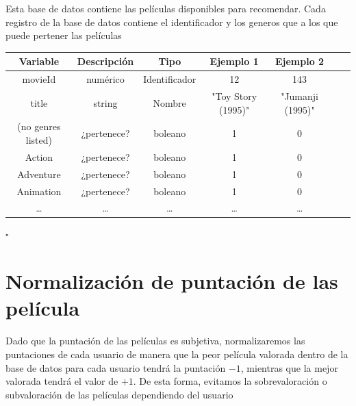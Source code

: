 \begin{db}\label{moviesref}
Esta base de datos contiene las películas disponibles para recomendar. Cada registro de la base de datos contiene el identificador y los generos que a los que puede pertener las películas

\begin{center}
    \begin{tabular}{|c|c|c|c|c|c|c|}
    \hline
    \textbf{Variable} & \textbf{Descripción} & \textbf{Tipo} & \textbf{Ejemplo 1} & \textbf{Ejemplo 2} \\ 
    \hline
    movieId & numérico   & Identificador &    12 &  143     \\
    \hline
    title   & string     & Nombre &    "Toy Story (1995)" &  "Jumanji (1995)"     \\
    \hline
    (no genres listed)  & ¿pertenece? & boleano &  1 &  0      \\
    Action              & ¿pertenece? & boleano &  1 &  0     \\
    Adventure           & ¿pertenece? & boleano &  1 &  0      \\
    Animation           & ¿pertenece? & boleano &  1 &  0      \\
    \dots & \dots                     &  \dots &  \dots &  \dots    \\
   \hline
    \end{tabular}
\end{center}
   \hfill$\square$
\end{db}

\section{Normalización de puntación de las película}

Dado que la puntación de las películas es subjetiva, normalizaremos las puntaciones de cada usuario de manera que la peor película valorada dentro de la base de datos para cada usuario tendrá la puntación $-1$, mientras que la mejor valorada tendrá el valor de $+1$. De esta forma, evitamos la sobrevaloración o subvaloración de las películas dependiendo del usuario


